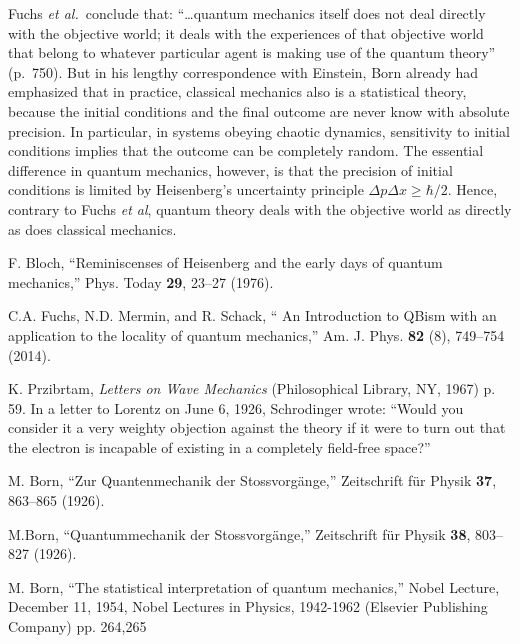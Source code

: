 \documentclass[prb,preprint]{revtex4-1}
\begin{document}
 

Fuchs {\it et al.\ }conclude that: ``\dots quantum mechanics itself does not deal directly with the objective world; it deals with the experiences of that objective world that belong to whatever particular agent is making use of the quantum theory'' (p.~750).  But in his lengthy correspondence with Einstein, Born already had emphasized that in practice, classical mechanics also is a statistical theory, because the initial conditions and the final outcome are never know with absolute precision.\cite{born3}  In particular, in systems obeying chaotic dynamics, sensitivity to initial conditions implies that the outcome can be completely random.  The essential difference in quantum mechanics, however, is that  the precision of initial conditions is limited by Heisenberg's uncertainty principle $\Delta p \Delta x \geq \hbar/2$.   Hence, contrary to Fuchs {\it et al}, quantum theory deals with the objective world as  directly as does classical mechanics.

 

\begin{thebibliography}{99}



  F. Bloch, ``Reminiscenses of Heisenberg and the early days of quantum mechanics,''  
                            Phys. Today \textbf{29}, 23--27 (1976).

   C.A. Fuchs, N.D. Mermin, and R. Schack, `` An Introduction to QBism with an application to the locality of
                          quantum mechanics,'' Am. J. Phys. {\bf 82} (8), 749--754 (2014).                      
                            

    K. Przibrtam, {\it Letters on Wave Mechanics} (Philosophical Library, NY, 1967) p. 59.
                            In a letter to Lorentz on June 6, 1926, Schrodinger wrote: ``Would you consider it a very
                            weighty objection against the theory if it were to turn out that the electron is incapable 
                            of existing in a completely  field-free space?''

                            
  M. Born, ``Zur Quantenmechanik der Stossvorg\"{a}nge,''
                           Zeitschrift f\"{u}r Physik {\bf 37}, 863--865 (1926).

   M.Born, ``Quantummechanik der Stossvorg\"{a}nge,''
                              Zeitschrift f\"{u}r Physik {\bf 38}, 803--827 (1926). 

   M. Born, ``The statistical interpretation of quantum mechanics,''
                               Nobel Lecture, December 11, 1954, Nobel Lectures in Physics, 1942-1962 (Elsevier Publishing Company)  pp. 264,265
                               
\end{thebibliography}
\end{document}
